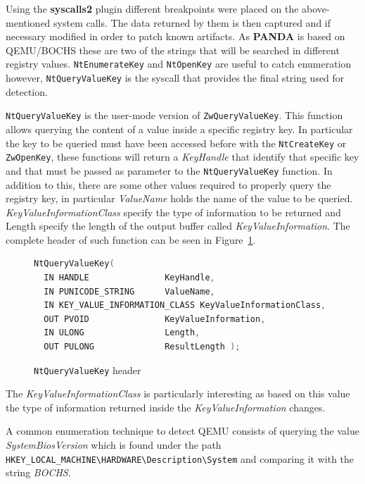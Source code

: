 Using the \textbf{syscalls2} plugin different breakpoints were placed on the above-mentioned system calls. The data returned by them is then captured and if necessary modified in order to patch known artifacts. As \textbf{PANDA} is based on QEMU/BOCHS these are two of the strings that will be searched in different registry values. \lstinline{NtEnumerateKey} and \lstinline{NtOpenKey} are useful to catch enumeration however, \lstinline{NtQueryValueKey} is the syscall that provides the final string used for detection.

\lstinline{NtQueryValueKey} is the user-mode version of \lstinline{ZwQueryValueKey}. This function allows querying the content of a value inside a specific registry key. In particular the key to be queried must have been accessed before with the \lstinline{NtCreateKey} or \lstinline{ZwOpenKey}, these functions will return a \textit{KeyHandle} that identify that specific key and that must be passed as parameter to the \lstinline{NtQueryValueKey} function. In addition to this, there are some other values required to properly query the registry key, in particular \textit{ValueName} holds the name of the value to be queried. \textit{KeyValueInformationClass} specify the type of information to be returned and Length specify the length of the output buffer called \textit{KeyValueInformation}. The complete header of such function can be seen in Figure~\ref{fig:querykey}.

\begin{figure}[htp]
\centering
\begin{lstlisting}[language=C]
NtQueryValueKey(
  IN HANDLE               KeyHandle,
  IN PUNICODE_STRING      ValueName,
  IN KEY_VALUE_INFORMATION_CLASS KeyValueInformationClass,
  OUT PVOID               KeyValueInformation,
  IN ULONG                Length,
  OUT PULONG              ResultLength );
\end{lstlisting}
\caption{\lstinline{NtQueryValueKey} header}
\label{fig:querykey}
\end{figure}

The \textit{KeyValueInformationClass} is particularly interesting as based on this value the type of information returned inside the \textit{KeyValueInformation} changes.

A common enumeration technique to detect QEMU consists of querying the value \textit{SystemBiosVersion} which is found under the path \lstinline{HKEY_LOCAL_MACHINE\HARDWARE\Description\System} and comparing it with the string \textit{BOCHS}.

